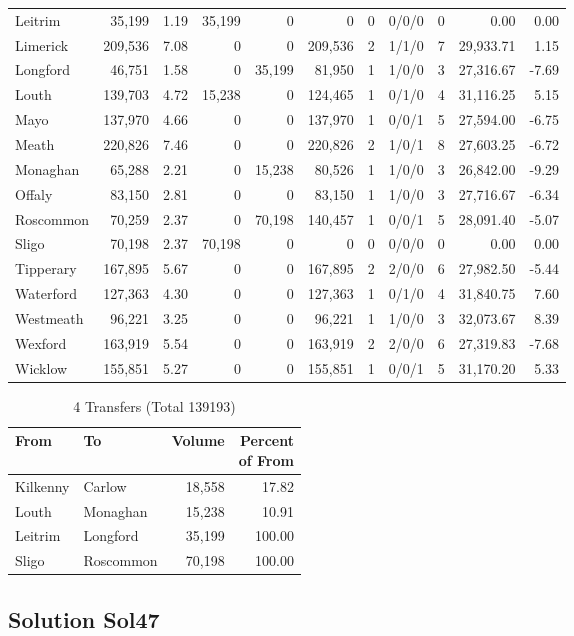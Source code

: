 \documentclass[a4paper]{article}
\begin{document}
\begin{longtable}{lrrrrrrlrrr}
Leitrim&35,199& 1.19&35,199&0&0&0&0/0/0&0& 0.00& 0.00\\ 
Limerick&209,536& 7.08&0&0&209,536&2&1/1/0&7&29,933.71& 1.15\\ 
Longford&46,751& 1.58&0&35,199&81,950&1&1/0/0&3&27,316.67&-7.69\\ 
Louth&139,703& 4.72&15,238&0&124,465&1&0/1/0&4&31,116.25& 5.15\\ 
Mayo&137,970& 4.66&0&0&137,970&1&0/0/1&5&27,594.00&-6.75\\ 
Meath&220,826& 7.46&0&0&220,826&2&1/0/1&8&27,603.25&-6.72\\ 
Monaghan&65,288& 2.21&0&15,238&80,526&1&1/0/0&3&26,842.00&-9.29\\ 
Offaly&83,150& 2.81&0&0&83,150&1&1/0/0&3&27,716.67&-6.34\\ 
Roscommon&70,259& 2.37&0&70,198&140,457&1&0/0/1&5&28,091.40&-5.07\\ 
Sligo&70,198& 2.37&70,198&0&0&0&0/0/0&0& 0.00& 0.00\\ 
Tipperary&167,895& 5.67&0&0&167,895&2&2/0/0&6&27,982.50&-5.44\\ 
Waterford&127,363& 4.30&0&0&127,363&1&0/1/0&4&31,840.75& 7.60\\ 
Westmeath&96,221& 3.25&0&0&96,221&1&1/0/0&3&32,073.67& 8.39\\ 
Wexford&163,919& 5.54&0&0&163,919&2&2/0/0&6&27,319.83&-7.68\\ 
Wicklow&155,851& 5.27&0&0&155,851&1&0/0/1&5&31,170.20& 5.33\\ 
\end{longtable}

\begin{table}[htbp]
\caption{4 Transfers (Total 139193)}
\centering
\begin{tabular}{llrr} \toprule
From &To &Volume &\shortstack{Percent\\of From} \\ \midrule
Kilkenny&Carlow&18,558&17.82\\ 
Louth&Monaghan&15,238&10.91\\ 
Leitrim&Longford&35,199&100.00\\ 
Sligo&Roscommon&70,198&100.00\\ 
\bottomrule
\end{tabular}
\end{table}

\clearpage
\subsection{Solution Sol47}
\end{document}
